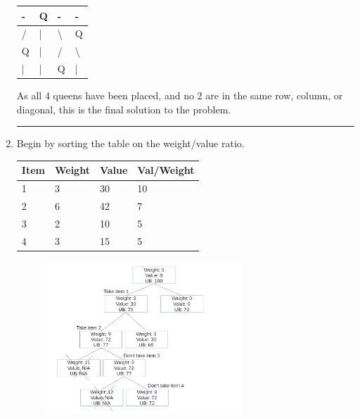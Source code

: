 \documentclass{article}
\begin{document}
\begin{enumerate}
\begin{table}[H]
\begin{tabular}{|l|l|l|l|}
\hline
- & Q & - & - \\ \hline
/ & | & \textbackslash{} & Q \\ \hline
Q & | & / & \textbackslash{} \\ \hline
| & | & Q & | \\ \hline
\end{tabular}
\end{table}

As all 4 queens have been placed, and no 2 are in the same row, column, or diagonal, this is the final solution to the problem. 





\noindent\rule{8cm}{0.4pt}

\item Begin by sorting the table on the weight/value ratio. 

\begin{table}[H]
\begin{tabular}{|l|l|l|l|}
\hline
Item & Weight & Value & Val/Weight \\ \hline
1 & 3 & 30 & 10 \\ \hline
2 & 6 & 42 & 7 \\ \hline
3 & 2 & 10 & 5 \\ \hline
4 & 3 & 15 & 5 \\ \hline
\end{tabular}
\end{table}


\begin{figure}[H]
        \centering
	\includegraphics[width=0.7\textwidth]{P8/branchandbound}
\end{figure}


\end{enumerate}
\end{document}
